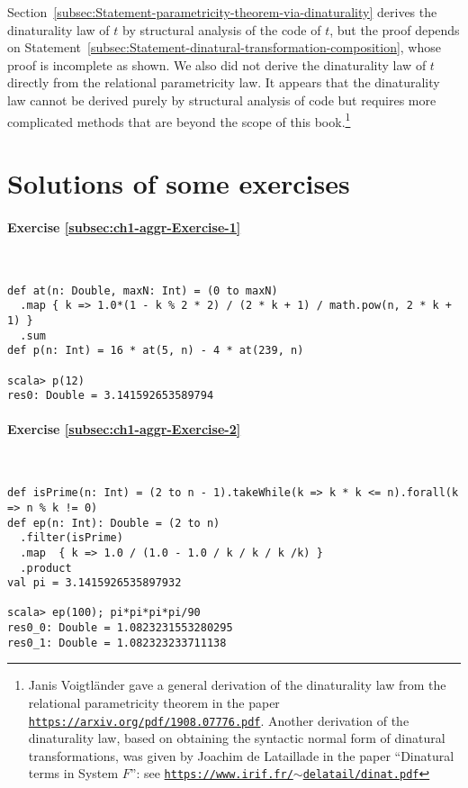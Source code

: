 Section~\ref{subsec:Statement-parametricity-theorem-via-dinaturality}
derives the dinaturality law of $t$ by structural analysis of the
code of $t$, but the proof depends on Statement~\ref{subsec:Statement-dinatural-transformation-composition},
whose proof is incomplete as shown. We also did not derive the dinaturality
law of $t$ directly from the relational parametricity law. It appears
that the dinaturality law cannot be derived purely by structural analysis
of code but requires more complicated methods that are beyond the
scope of this book.\footnote{Janis Voigtl\"ander gave a general
derivation of the dinaturality law from the relational parametricity
theorem in the paper \texttt{\href{https://arxiv.org/pdf/1908.07776.pdf}{https://arxiv.org/pdf/1908.07776.pdf}}.
Another derivation of the dinaturality law, based on obtaining the
syntactic normal form of dinatural transformations, was given by Joachim
de Lataillade in the paper \textsf{``}Dinatural
terms in System $F$\textsf{''}: see \texttt{\href{https://www.irif.fr/~delatail/dinat.pdf}{https://www.irif.fr/$\sim$delatail/dinat.pdf}}} 

\chapter{Solutions of some exercises}

\subsubsection*{Exercise \ref{subsec:ch1-aggr-Exercise-1}}

~
\begin{lstlisting}
def at(n: Double, maxN: Int) = (0 to maxN)
  .map { k => 1.0*(1 - k % 2 * 2) / (2 * k + 1) / math.pow(n, 2 * k + 1) }
  .sum
def p(n: Int) = 16 * at(5, n) - 4 * at(239, n)

scala> p(12)
res0: Double = 3.141592653589794
\end{lstlisting}


\subsubsection*{Exercise \ref{subsec:ch1-aggr-Exercise-2}}

~
\begin{lstlisting}
def isPrime(n: Int) = (2 to n - 1).takeWhile(k => k * k <= n).forall(k => n % k != 0)
def ep(n: Int): Double = (2 to n)
  .filter(isPrime)
  .map  { k => 1.0 / (1.0 - 1.0 / k / k / k /k) }
  .product
val pi = 3.1415926535897932

scala> ep(100); pi*pi*pi*pi/90
res0_0: Double = 1.0823231553280295
res0_1: Double = 1.082323233711138 
\end{lstlisting}


